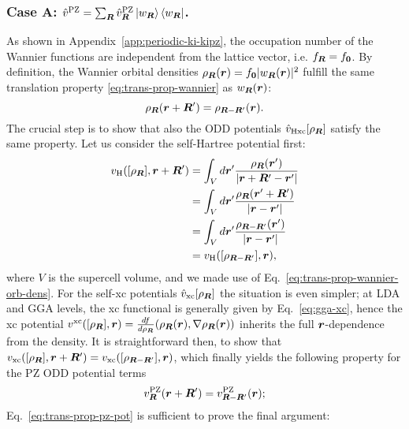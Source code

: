 \subsubsection*{Case A: $\hat{v}^{\rm PZ} = \sum_{{\bm R}} \hat{v}^{\rm PZ}_{{\bm R}} \ket{w_{{\bm R}}} \bra{w_{{\bm R}}}$.}
As shown in Appendix~\ref{app:periodic-ki-kipz}, the occupation number of the Wannier functions are independent from the lattice vector, i.e. $f_{{\bm R}} = f_{\bm 0}$. By definition, the Wannier orbital densities $\rho_{{\bm R}}({\bm r}) = f_{\bm 0} |w_{{\bm R}}({\bm r})|^2$ fulfill the same translation property \eqref{eq:trans-prop-wannier} as $w_{{\bm R}}({\bm r})$:
%
\begin{equation}
    \rho_{{\bm R}}({\bm r} + {\bm R}') = \rho_{{\bm R} - {\bm R}'}({\bm r}) .
    \label{eq:trans-prop-wannier-orb-dens}
\end{equation}
%
The crucial step is to show that also the ODD potentials $\hat{v}_{\rm Hxc}[\rho_{{\bm R}}]$ satisfy the same property. Let us consider the self-Hartree potential first:
%
\begin{equation}
    \begin{split}
        v_{\rm H}([\rho_{{\bm R}}],{\bm r} + {\bm R}') & = \int_V d{\bm r}' \frac{\rho_{{\bm R}}({\bm r}')}{|{\bm r} + {\bm R}' - {\bm r}'|} \\ 
        & = \int_V d{\bm r}' \frac{\rho_{{\bm R}}({\bm r}' + {\bm R}')}{|{\bm r} - {\bm r}'|} \\
        & = \int_V d{\bm r}' \frac{\rho_{{\bm R} - {\bm R}'}({\bm r}')}{|{\bm r} - {\bm r}'|} \\
        & = v_{\rm H}([\rho_{{\bm R} - {\bm R}'}],{\bm r}) ,
    \end{split}
\end{equation}
%
where $V$ is the supercell volume, and we made use of Eq.~\eqref{eq:trans-prop-wannier-orb-dens}. For the self-xc potentials $\hat{v}_{\rm xc}[\rho_{{\bm R}}]$ the situation is even simpler; at LDA and GGA levels, the xc functional is generally given by Eq.~\eqref{eq:gga-xc}, hence the xc potential $v^{\rm xc}([\rho_{{\bm R}}],{\bm r}) = \frac{df}{d\rho_{{\bm R}}}(\rho_{{\bm R}}({\bm r}), \nabla\rho_{{\bm R}}({\bm r}))$ inherits the full ${\bm r}$-dependence from the density. It is straightforward then, to show that $v_{\rm xc}([\rho_{{\bm R}}],{\bm r} + {\bm R}') = v_{\rm xc}([\rho_{{\bm R} - {\bm R}'}],{\bm r})$, which finally yields the following property for the PZ ODD potential terms
%
\begin{equation}
    v^{\rm PZ}_{{\bm R}}({\bm r} + {\bm R}') = v^{\rm PZ}_{{\bm R} - {\bm R}'}({\bm r}) ;
    \label{eq:trans-prop-pz-pot}
\end{equation}
%
Eq.~\eqref{eq:trans-prop-pz-pot} is sufficient to prove the final argument:
%
